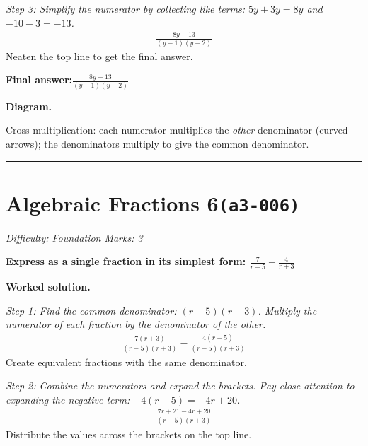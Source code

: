 \documentclass[11pt]{article}
\newcommand{\question}[1]{\par\medskip\noindent\textbf{#1}\par}
\begin{document}
\textit{Step 3: Simplify the numerator by collecting like terms: \( 5y + 3y = 8y \) and \( -10 - 3 = -13 \).}
\[\begin{gathered}
\frac{8y - 13}{(y-1)(y-2)}
\end{gathered}\]
Neaten the top line to get the final answer.

\begin{answerbox}
\textbf{Final answer:}\quad \(\displaystyle \frac{8y - 13}{(y-1)(y-2)}\)
\end{answerbox}
\textbf{Diagram.}

\begin{center}
\end{center}
\small Cross-multiplication: each numerator multiplies the \emph{other} denominator (curved arrows); the denominators multiply to give the common denominator.\normalsize

\medskip\hrule

\section*{Algebraic Fractions 6\quad\small\texttt{(a3-006)}}
\textit{Difficulty: Foundation \quad\textbar\quad Marks: 3}

\question{Express as a single fraction in its simplest form: \( \frac{7}{r-5} - \frac{4}{r+3} \)}

\textbf{Worked solution.}

\textit{Step 1: Find the common denominator: \( (r-5)(r+3) \). Multiply the numerator of each fraction by the denominator of the other.}
\[\begin{gathered}
\frac{7(r+3)}{(r-5)(r+3)} - \frac{4(r-5)}{(r-5)(r+3)}
\end{gathered}\]
Create equivalent fractions with the same denominator.

\textit{Step 2: Combine the numerators and expand the brackets. Pay close attention to expanding the negative term: \( -4(r-5) = -4r + 20 \).}
\[\begin{gathered}
\frac{7r + 21 - 4r + 20}{(r-5)(r+3)}
\end{gathered}\]
Distribute the values across the brackets on the top line.
\end{document}
